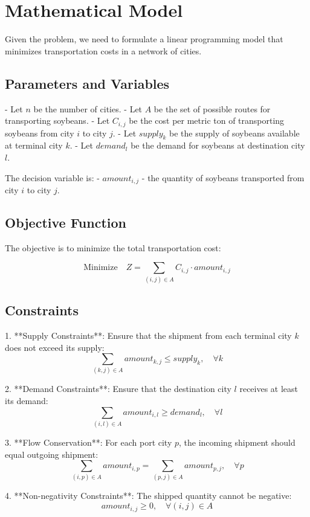 \documentclass{article}
\begin{document}
\section*{Mathematical Model}

Given the problem, we need to formulate a linear programming model that minimizes transportation costs in a network of cities.

\subsection*{Parameters and Variables}
- Let \( n \) be the number of cities.
- Let \( A \) be the set of possible routes for transporting soybeans.
- Let \( C_{i,j} \) be the cost per metric ton of transporting soybeans from city \( i \) to city \( j \).
- Let \( supply_k \) be the supply of soybeans available at terminal city \( k \).
- Let \( demand_l \) be the demand for soybeans at destination city \( l \).

The decision variable is:
- \( amount_{i,j} \) - the quantity of soybeans transported from city \( i \) to city \( j \).

\subsection*{Objective Function}
The objective is to minimize the total transportation cost:

\[
\text{Minimize} \quad Z = \sum_{(i,j) \in A} C_{i,j} \cdot amount_{i,j}
\]

\subsection*{Constraints}

1. **Supply Constraints**: Ensure that the shipment from each terminal city \( k \) does not exceed its supply:
   \[
   \sum_{(k,j) \in A} amount_{k,j} \leq supply_k, \quad \forall k
   \]

2. **Demand Constraints**: Ensure that the destination city \( l \) receives at least its demand:
   \[
   \sum_{(i,l) \in A} amount_{i,l} \geq demand_l, \quad \forall l
   \]

3. **Flow Conservation**: For each port city \( p \), the incoming shipment should equal outgoing shipment:
   \[
   \sum_{(i,p) \in A} amount_{i,p} = \sum_{(p,j) \in A} amount_{p,j}, \quad \forall p
   \]

4. **Non-negativity Constraints**: The shipped quantity cannot be negative:
   \[
   amount_{i,j} \geq 0, \quad \forall (i,j) \in A
   \]
\end{document}

